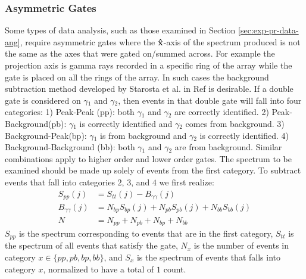 \subsubsection{Asymmetric Gates}
\label{sssec:exp-pr-data-proc-bg-sub-asym}
Some types of data analysis, such as those examined in Section \ref{sec:exp-pr-data-ang}, require asymmetric gates where the $\boldsymbol{\hat{\textbf{x}}}$-axis of the spectrum produced is not the same as the axes that were gated on/summed across. For example the projection axis is gamma rays recorded in a specific ring of the array while the gate is placed on all the rings of the array. In such cases the background subtraction method developed by Starosta et al. in Ref \cite{asymBGSub} is desirable. If a double gate is considered on $\gamma{}_1$ and $\gamma{}_2$, then events in that double gate will fall into four categories: 1) Peak-Peak (pp): both $\gamma{}_1$ and $\gamma{}_2$ are correctly identified. 2) Peak-Background(pb): $\gamma{}_1$ is correctly identified and $\gamma{}_2$ comes from background. 3) Background-Peak(bp): $\gamma{}_1$ is from background and $\gamma{}_2$ is correctly identified. 4) Background-Background (bb): both $\gamma{}_1$ and $\gamma{}_2$ are from background. Similar combinations apply to higher order and lower order gates. The spectrum to be examined should be made up solely of events from the first category. To subtract events that fall into categories $2$, $3$, and $4$ we first realize:
\begin{align}
S_{pp}(j) &= S_{tt}(j) - B_{\gamma{}\gamma{}}(j)\label{eqn:chp3-asym-pp}\\
B_{\gamma{}\gamma{}}(j) &= N_{bp}S_{bp}(j) + N_{pb}S_{pb}(j) + N_{bb}S_{bb}(j)\label{eqn:chp3-asym-gg}\\
N &= N_{pp} + N_{pb} + N_{bp} + N_{bb} \label{eqn:chp3-asym-N}
\end{align}
$S_{pp}$ is the spectrum corresponding to events that are in the first category, $S_{tt}$ is the spectrum of all events that satisfy the gate, $N_{x}$ is the number of events in category $x\in{}\{pp,pb,bp,bb\}$, and $S_{x}$ is the spectrum of events that falls into category $x$, normalized to have a total of $1$ count.

